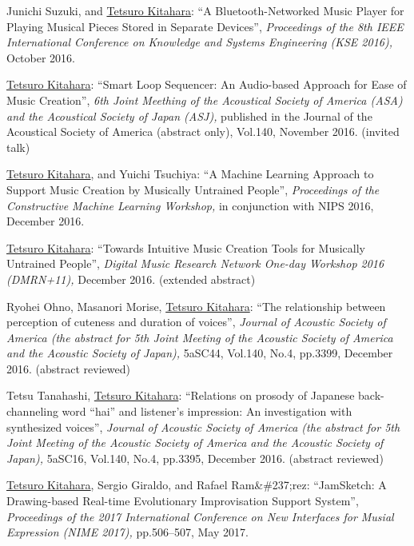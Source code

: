 \begin{Enumerate}
\item 
Junichi Suzuki, 
and 
\underline{Tetsuro Kitahara}: 
    ``A Bluetooth-Networked Music Player for Playing Musical Pieces Stored in Separate Devices'', 
    {\it Proceedings of the 8th IEEE International Conference on Knowledge and Systems Engineering (KSE 2016),
    } October 2016. 

\item 
\underline{Tetsuro Kitahara}: 
    ``Smart Loop Sequencer: An Audio-based Approach for Ease of Music Creation'', 
    {\it 6th Joint Meething of the Acoustical Society of America (ASA) and the Acoustical Society of Japan (ASJ),
    } published in the Journal of the Acoustical Society of America (abstract only), Vol.140, November 2016. 
(invited talk)
\item 
\underline{Tetsuro Kitahara}, 
and 
Yuichi Tsuchiya: 
    ``A Machine Learning Approach to Support Music Creation by Musically Untrained People'', 
    {\it Proceedings of the Constructive Machine Learning Workshop,
    } in conjunction with NIPS 2016, December 2016. 

\item 
\underline{Tetsuro Kitahara}: 
    ``Towards Intuitive Music Creation Tools for Musically Untrained People'', 
    {\it Digital Music Research Network One-day Workshop 2016 (DMRN+11),
    } December 2016. 
(extended abstract)
\item 
Ryohei Ohno, 
Masanori Morise, 
\underline{Tetsuro Kitahara}: 
    ``The relationship between perception of cuteness and duration of voices'', 
    {\it Journal of Acoustic Society of America (the abstract for 5th Joint Meeting of the Acoustic Society of America and the Acoustic Society of Japan),
    } 5aSC44, Vol.140, No.4, pp.3399, December 2016. 
(abstract reviewed)
\item 
Tetsu Tanahashi, 
\underline{Tetsuro Kitahara}: 
    ``Relations on prosody of Japanese back-channeling word “hai”
and listener’s impression: An investigation with synthesized voices'', 
    {\it Journal of Acoustic Society of America (the abstract for 5th Joint Meeting of the Acoustic Society of America and the Acoustic Society of Japan),
    } 5aSC16, Vol.140, No.4, pp.3395, December 2016. 
(abstract reviewed)
\item 
\underline{Tetsuro Kitahara}, 
Sergio Giraldo, 
and 
Rafael Ram\&\#237;rez: 
    ``JamSketch: A Drawing-based Real-time Evolutionary Improvisation Support System'', 
    {\it Proceedings of the 2017 International Conference on New Interfaces for Musial Expression (NIME 2017),
    } pp.506--507, May 2017. 


\end{Enumerate}

